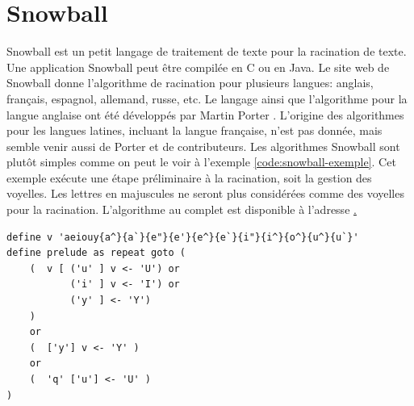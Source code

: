 \section{Snowball}
Snowball est un petit langage de traitement de texte pour la racination de texte.
Une application Snowball peut \^etre compil\'ee en C ou en Java.
Le site web de Snowball donne l'algorithme de racination pour plusieurs langues: anglais, fran\c{c}ais, espagnol, allemand, russe, etc.
Le langage ainsi que l'algorithme pour la langue anglaise ont \'et\'e d\'evelopp\'es par Martin Porter \cite{snowball}.
%
%
L'origine des algorithmes pour les langues latines, incluant la langue fran\c{c}aise, n'est pas donn\'ee, mais semble venir aussi de Porter et de contributeurs.
Les algorithmes Snowball sont plut\^ot simples comme on peut le voir \`a l'exemple \ref{code:snowball-exemple}.
Cet exemple ex\'ecute une \'etape pr\'eliminaire \`a la racination, soit la gestion des voyelles.
Les lettres en majuscules ne seront plus consid\'er\'ees comme des voyelles pour la racination.
L'algorithme au complet est disponible \`a l'adresse \href{https://raw.githubusercontent.com/snowballstem/snowball/master/algorithms/french/stem_ISO_8859_1.sbl}.
\begin{lstfloat}
\begin{lstlisting}[frame=l]
define v 'aeiouy{a^}{a`}{e"}{e'}{e^}{e`}{i"}{i^}{o^}{u^}{u`}'
define prelude as repeat goto (
    (  v [ ('u' ] v <- 'U') or
           ('i' ] v <- 'I') or
           ('y' ] <- 'Y')
    )
    or
    (  ['y'] v <- 'Y' )
    or
    (  'q' ['u'] <- 'U' )
)
\end{lstlisting}
\caption{Exemple de l'algorithme de racination en fran\c{c}ais en Snowball.}
\label{code:snowball-exemple}
\end{lstfloat}
